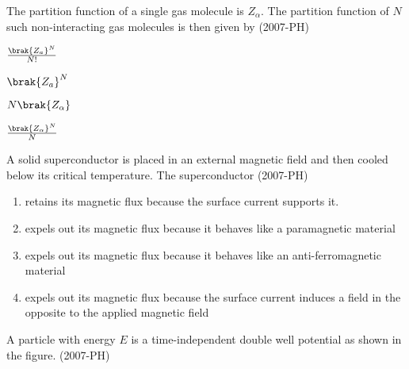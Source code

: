    \item The partition function of a single gas molecule is $Z_{\alpha}$. The partition function of $N$ such non-interacting gas molecules is then given by \hfill (2007-PH)
    \begin{enumerate}
        \begin{multicols}{2}
            \item $\frac{\brak{Z_a}^N}{N!}$
            \item $\brak{Z_a}^N$
            \item $N\brak{Z_{\alpha}}$
            \item $\frac{\brak{Z_{\alpha}}^N}{N}$
        \end{multicols}
    \end{enumerate}
    \item A solid superconductor is placed in an external magnetic field and then cooled below its critical temperature. The superconductor \hfill (2007-PH)
    \begin{enumerate}
        \item retains its magnetic flux because the surface current supports it.
        \item expels out its magnetic flux because it behaves like a paramagnetic material 
        \item expels out its magnetic flux because it behaves like an anti-ferromagnetic material 
        \item expels out its magnetic flux because the surface current induces a field in the opposite to the applied magnetic field 
    \end{enumerate}
    \item A particle with energy $E$ is a time-independent double well potential as shown in the figure. \hfill (2007-PH)
    \begin{figure}[H]
\centering
{}%
\end{figure}
    
